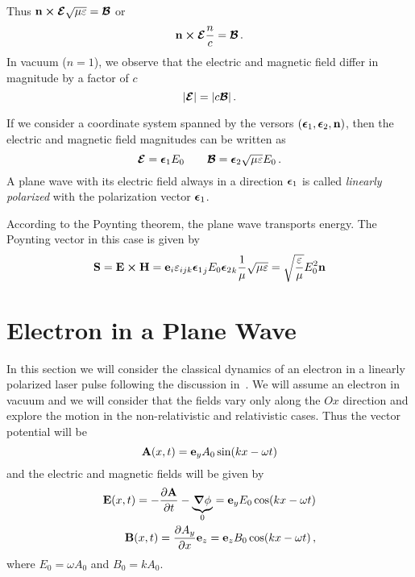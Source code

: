 \documentclass[12pt, class=report, crop=false]{standalone}
\begin{document}
Thus \(\vb{n} \cp \vb*{\mathcal{E}} \sqrt{\mu\varepsilon} = \vb*{\mathcal{B}}\) or
\[
\vb{n} \cp \vb*{\mathcal{E}} \frac{n}{c} = \vb*{\mathcal{B}}\,.
\]
In vacuum (\(n=1\)), we observe that the electric and magnetic field differ in magnitude by a factor of \(c\)
\begin{equation}
  \label{eq:e-b-magnitude-comparison}
  \abs{\vb*{\mathcal{E}}} = \abs{c\vb*{\mathcal{B}}}\,.
\end{equation}

If we consider a coordinate system spanned by the versors
\((\vb*{\epsilon}_1,\vb*{\epsilon}_2,\vb{n})\), then the electric
and magnetic field magnitudes can be written as
\[
\vb*{\mathcal{E}} = \vb*{\epsilon}_1 E_0 \qquad
\vb*{\mathcal{B}} = \vb*{\epsilon}_2 \sqrt{\mu\varepsilon} E_0\,.
\]
A plane wave with its electric field always in a direction \(\vb*{\epsilon}_1\) is called \emph{linearly polarized} with the
polarization vector \(\vb*{\epsilon}_1\).

According to the Poynting theorem, the plane wave transports energy. The Poynting vector in this case is given by
\[
\vb{S} = \vb{E} \cp \vb{H} =
\vb{e}_i \varepsilon_{ijk} {\vb*{\epsilon}_1}_j E_0 {\vb*{\epsilon}_2}_k \frac{1}{\mu} \sqrt{\mu\varepsilon} =
\sqrt{\frac{\varepsilon}{\mu}} E_0^2\vb{n}
\]

\section{Electron in a Plane Wave}

In this section we will consider the classical dynamics of an electron in a linearly polarized
laser pulse following the discussion in~\textcite{karsch_applicationshigh_2018}.
We will assume an electron in vacuum and we will consider that the fields vary only along the \(Ox\) direction
and explore the motion in the non-relativistic and relativistic
cases.
Thus the vector potential will be
\begin{equation}
  \label{eq:simple-laser-A}
  \vb{A}(x,t) = \vb{e}_y A_0 \sin(kx - \omega t)
\end{equation}
and the electric and magnetic fields will be given by
\[
\begin{aligned}
  \vb{E}(x,t) = -\pdv{\vb{A}}{t} -\underbrace{\grad{\phi}}_0
  = \vb{e}_y E_0 \cos(kx - \omega t) \\
  \vb{B}(x,t) = \pdv{A_y}{x}\vb{e}_z = \vb{e}_z B_0 \cos(kx - \omega t)\,,
\end{aligned}
\]
where \(E_0=\omega A_0\) and \(B_0=k A_0\).
\end{document}
